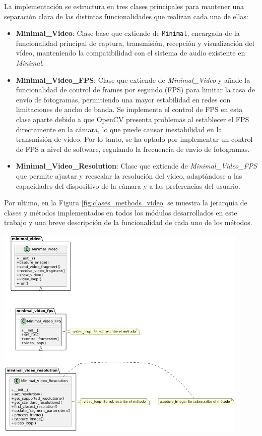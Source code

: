 La implementación se estructura en tres clases principales para mantener una separación clara de las distintas funcionalidades que realizan cada una de ellas:

\begin{itemize}
    \item \textbf{Minimal\_Video}: Clase base que extiende de \texttt{Minimal}, encargada de la funcionalidad principal de captura, transmisión, recepción y visualización del vídeo, manteniendo la compatibilidad con el sistema de audio existente en \textit{Minimal}.
    \item \textbf{Minimal\_Video\_FPS}: Clase que extiende de \textit{Minimal\_Video} y añade la funcionalidad de control de frames por segundo (FPS) para limitar la tasa de envío de fotogramas, permitiendo una mayor estabilidad en redes con limitaciones de ancho de banda. Se implementa el control de FPS en esta clase aparte debido a que OpenCV presenta problemas al establecer el FPS directamente en la cámara, lo que puede causar inestabilidad en la transmisión de vídeo. Por lo tanto, se ha optado por implementar un control de FPS a nivel de software, regulando la frecuencia de envío de fotogramas.
    \item \textbf{Minimal\_Video\_Resolution}: Clase que extiende de \textit{Minimal\_Video\_FPS} que permite ajustar y reescalar la resolución del vídeo, adaptándose a las capacidades del dispositivo de la cámara y a las preferencias del usuario.
\end{itemize}

Por ultimo, en la Figura \ref{fig:clases_methods_video} se muestra la jerarquía de clases y métodos implementados en todos los módulos desarrollados en este trabajo y una breve descripción de la funcionalidad de cada uno de los métodos.
\begin{center}
    \includegraphics[width = 0.91\textwidth]{images/uml.png}
    \label{fig:clases_methods_video}
\end{center}

